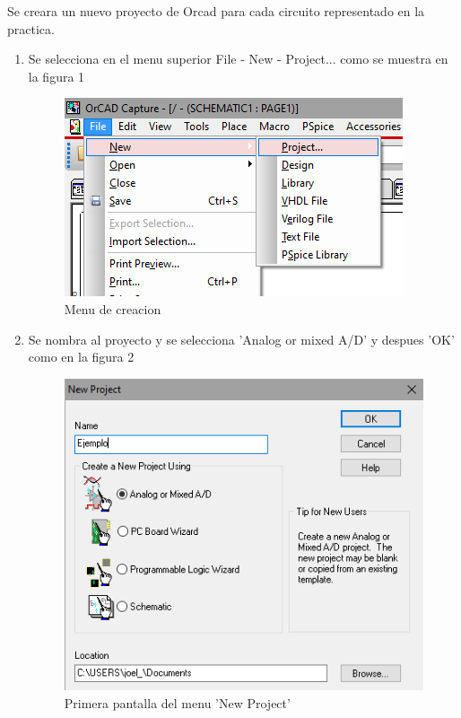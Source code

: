 \documentclass[letterpaper]{article}
\begin{document}
         
    \begin{large}
        Se creara un nuevo proyecto de Orcad para cada circuito representado en la practica.
        \begin{enumerate}
            \item Se selecciona en el menu superior File - New - Project... como se muestra en la figura 1\\
            \begin{figure}[htb]
                \centering
                \includegraphics[scale=1]{p1.png}
                \caption{Menu de creacion}
                \label{fig:Menu Creacion}
            \end{figure}
            \item Se nombra al proyecto y se selecciona 'Analog or mixed A/D' y despues 'OK' como en la figura 2\\ \newpage
            \begin{figure}[htb]
                \centering
                \includegraphics[scale=0.5]{p2.png}
                \caption{Primera pantalla del menu 'New Project'}

\end{figure}
\end{enumerate}
\end{large}
\end{document}
